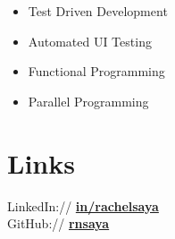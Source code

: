 \documentclass[letterpaper]{outline} %
\begin{document}
\begin{minipage}[t]{0.35\textwidth}
\begin{itemize}
\item Test Driven Development
\item Automated UI Testing
\item Functional Programming
\item Parallel Programming

\end{itemize}

\sectionspace %


\section{Links}

LinkedIn:// \href{https://www.linkedin.com/in/rachel-saya-59a6b285}{\bf in/rachelsaya} \\
GitHub:// \href{https://github.com/}{\bf rnsaya} \\

\sectionspace %


\end{minipage} %
\hfill
%
%
\end{document}
